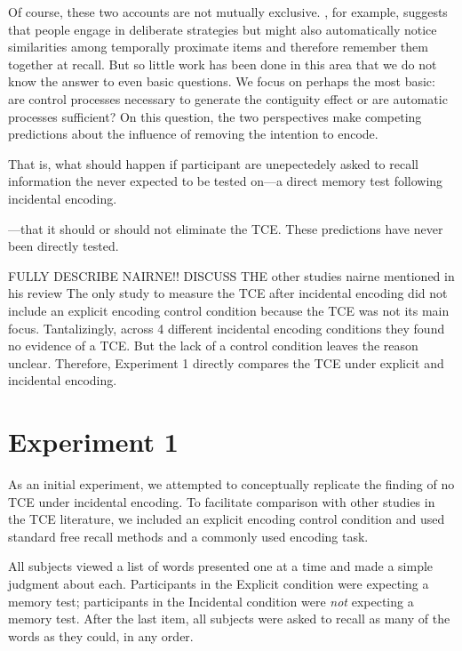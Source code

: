 \documentclass[man,natbib,floatsintext]{apa6} %
\begin{document}
Of course, these two accounts are not mutually exclusive. \citet{Hint16}, for example, suggests that people engage in deliberate strategies but might also automatically notice similarities among temporally proximate items and therefore remember them together at recall. But so little work has been done in this area that we do not know the answer to even basic questions. We focus on perhaps the most basic: are control processes necessary to generate the contiguity effect or are automatic processes sufficient? On this question, the two perspectives make competing predictions about the influence of removing the intention to encode. 

\label{TODO-3} %
That is, what should happen if participant are unepectedely asked to recall information the never expected to be tested on---a direct memory test following incidental encoding.


---that it should or should not eliminate the TCE. These predictions have never been directly tested. 

\label{TODO-4} FULLY DESCRIBE NAIRNE!!
\label{TODO-8} DISCUSS THE other studies nairne mentioned in his review
The only study to measure the TCE after incidental encoding \citep{NairEtal17} did not include an explicit encoding control condition because the TCE was not its main focus. Tantalizingly, across 4 different incidental encoding conditions they found no evidence of a TCE. But the lack of a control condition leaves the reason unclear. Therefore, Experiment 1 directly compares the TCE under explicit and incidental encoding.




\section{Experiment 1}
As an initial experiment, we attempted to conceptually replicate the \citet{NairEtal17} finding of no TCE under incidental encoding. To facilitate comparison with other studies in the TCE literature, we included an explicit encoding control condition and used standard free recall methods and a commonly used encoding task. 

All subjects viewed a list of words presented one at a time and made a simple judgment about each. Participants in the Explicit condition were expecting a memory test; participants in the Incidental condition were \emph{not} expecting a memory test.  After the last item, all subjects were asked to recall as many of the words as they could, in any order. 
\end{document}
